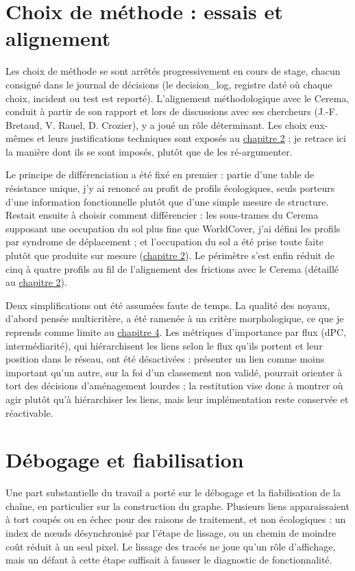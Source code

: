 \documentclass[a4paper,11pt]{report}
\begin{document}
\section{Choix de méthode : essais et alignement}\label{sec:6.2}

Les choix de méthode se sont arrêtés progressivement en cours de stage, chacun consigné dans le journal de décisions (le decision\_log, registre daté où chaque choix, incident ou test est reporté). L'alignement méthodologique avec le Cerema, conduit à partir de son rapport et lors de discussions avec ses chercheurs (J.-F. Bretaud, V. Rauel, D. Crozier), y a joué un rôle déterminant. Les choix eux-mêmes et leurs justifications techniques sont exposés au \hyperref[chap:2]{chapitre 2} ; je retrace ici la manière dont ils se sont imposés, plutôt que de les ré-argumenter.

Le principe de différenciation a été fixé en premier : partie d'une table de résistance unique, j'y ai renoncé au profit de profils écologiques, seuls porteurs d'une information fonctionnelle plutôt que d'une simple mesure de structure. Restait ensuite à choisir comment différencier : les sous-trames du Cerema supposant une occupation du sol plus fine que WorldCover, j'ai défini les profils par syndrome de déplacement ; et l'occupation du sol a été prise toute faite plutôt que produite sur mesure (\hyperref[chap:2]{chapitre 2}). Le périmètre s'est enfin réduit de cinq à quatre profils au fil de l'alignement des frictions avec le Cerema (détaillé au \hyperref[chap:2]{chapitre 2}).

Deux simplifications ont été assumées faute de temps. La qualité des noyaux, d'abord pensée multicritère, a été ramenée à un critère morphologique, ce que je reprends comme limite au \hyperref[chap:4]{chapitre 4}. Les métriques d'importance par flux (dPC, intermédiarité), qui hiérarchisent les liens selon le flux qu'ils portent et leur position dans le réseau, ont été désactivées : présenter un lien comme moins important qu'un autre, sur la foi d'un classement non validé, pourrait orienter à tort des décisions d'aménagement lourdes ; la restitution vise donc à montrer où agir plutôt qu'à hiérarchiser les liens, mais leur implémentation reste conservée et réactivable.

\section{Débogage et fiabilisation}\label{sec:6.3}

Une part substantielle du travail a porté sur le débogage et la fiabilisation de la chaîne, en particulier sur la construction du graphe. Plusieurs liens apparaissaient à tort coupés ou en échec pour des raisons de traitement, et non écologiques : un index de n\oe{}uds désynchronisé par l'étape de lissage, ou un chemin de moindre coût réduit à un seul pixel. Le lissage des tracés ne joue qu'un rôle d'affichage, mais un défaut à cette étape suffisait à fausser le diagnostic de fonctionnalité.
\end{document}
